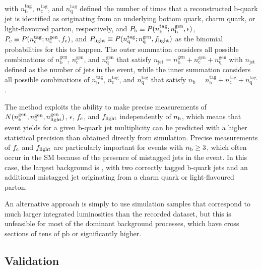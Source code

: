 with $n_{\textrm{b}}^{\textrm{tag}}$,
$n_{\textrm{c}}^{\textrm{tag}}$, and $n_{\textrm{q}}^{\textrm{tag}}$
defined the number of times that a reconstructed b-quark jet is identified
as originating from an underlying bottom quark, charm quark, or
light-flavoured parton, respectively, and $P_{\rm b} \equiv
P(n_{\textrm{b}}^{\textrm{tag}} ; n_{\textrm{b}}^{\textrm{gen}},
\epsilon)$, $P_{\rm c} \equiv P(n_{\textrm{c}}^{\textrm{tag}} ;
n_{\textrm{c}}^{\textrm{gen}}, f_{\rm c})$, and $P_{\rm light} \equiv
P(n_{\textrm{q}}^{\textrm{tag}} ; n_{\textrm{q}}^{\textrm{gen}},
f_{\rm light})$ as the binomial probabilities for this to happen.
The outer summation considers all possible combinations of
$n_{\textrm{b}}^{\textrm{gen}}$, $n_{\textrm{c}}^{\textrm{gen}}$, and
$n_{\textrm{q}}^{\textrm{gen}}$ that satisfy $n_{\textrm{jet}} =
n_{\textrm{b}}^{\textrm{gen}} + n_{\textrm{c}}^{\textrm{gen}} +
n_{\textrm{q}}^{\textrm{gen}}$ with $n_{\textrm{jet}}$ defined as the number 
of jets in the event, while the inner summation considers
all possible combinations of $n_{\textrm{b}}^{\textrm{tag}}$,
$n_{\textrm{c}}^{\textrm{tag}}$, and $n_{\textrm{q}}^{\textrm{tag}}$
that satisfy $n_{\textrm{b}} = n_{\textrm{b}}^{\textrm{tag}} +
n_{\textrm{c}}^{\textrm{tag}} + n_{\textrm{q}}^{\textrm{tag}}$.
  
The method exploits the ability to make precise measurements of
$N(n_{\rm b}^{\rm gen},n_{\rm c}^{\rm gen},n_{\rm light}^{\rm gen})$,
$\epsilon$, $f_{\rm c}$, and $f_{\rm light}$ independently of $n_{\rm
  b}$, which means that event yields for a given b-quark jet
multiplicity can be predicted with a higher statistical precision than
obtained directly from simulation. Precise measurements of $f_{\rm c}$
and $f_{\rm light}$ are particularly important for events with $n_{\rm
  b} \geq 3$, which often occur in the SM because of the presence of
mistagged jets in the event. In this case, the largest background is
\ttbar, with two correctly tagged b-quark jets and an additional
mistagged jet originating from a charm quark or light-flavoured
parton.

An alternative approach is simply to use simulation samples that
correspond to much larger integrated luminosities than the recorded
dataset, but this is unfeasible for most of the dominant background
processes, which have cross sections of tens of pb or significantly
higher.

\subsection{Validation}

